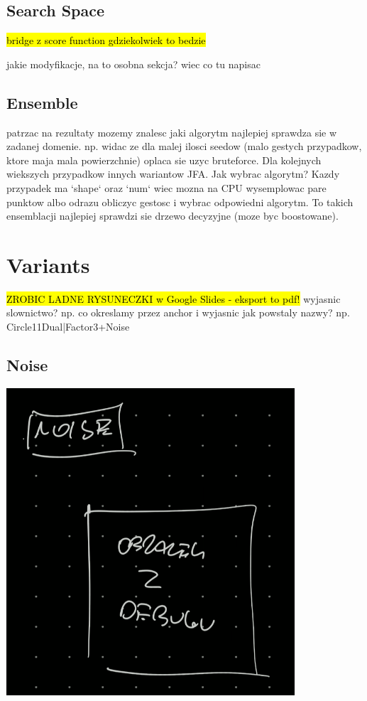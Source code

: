 \documentclass{article}
\begin{document}
\subsection{Search Space} %

\hl{bridge z score function gdziekolwiek to bedzie}

jakie modyfikacje, na to osobna sekcja? wiec co tu napisac

\subsection{Ensemble} %

patrzac na rezultaty mozemy znalesc jaki algorytm najlepiej sprawdza sie w
zadanej domenie. np. widac ze dla malej ilosci seedow (malo gestych przypadkow,
ktore maja mala powierzchnie) oplaca sie uzyc bruteforce. Dla kolejnych
wiekszych przypadkow innych wariantow JFA. Jak wybrac algorytm? Kazdy przypadek ma `shape` oraz `num` wiec mozna na CPU wysemplowac
pare punktow albo odrazu obliczyc gestosc i wybrac odpowiedni algorytm.
To takich ensemblacji najlepiej sprawdzi sie drzewo decyzyjne (moze byc boostowane).

\section{Variants} %

\hl{ZROBIC LADNE RYSUNECZKI w Google Slides - eksport to pdf!}
wyjasnic slownictwo? np. co okreslamy przez anchor
i wyjasnic jak powstaly nazwy? np. Circle11Dual|Factor3+Noise

\subsection{Noise} %

\includegraphics[width=0.5\linewidth]{../figures/idea_noise}
\end{document}
